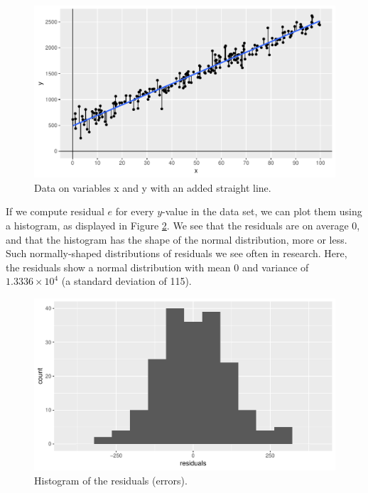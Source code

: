 \documentclass[]{report}\usepackage[]{graphicx}\usepackage[]{color}
\makeatletter
\def\maxwidth{ %
  \ifdim\Gin@nat@width>\linewidth
    \linewidth
  \else
    \Gin@nat@width
  \fi
}
\newenvironment{knitrout}{}{} %
\makeatother
\begin{document}
\begin{knitrout}
\color{fgcolor}\begin{figure}

{\centering \includegraphics[width=\maxwidth]{figure/lm_10-1} 

}

\caption[Data on variables x and y with an added straight line]{Data on variables x and y with an added straight line.}\label{fig:lm_10}
\end{figure}


\end{knitrout}

If we compute residual $e$ for every $y$-value in the data set, we can plot them using a histogram, as displayed in Figure \ref{fig:lm_11}. We see that the residuals are on average 0, and that the histogram has the shape of the normal distribution, more or less. Such normally-shaped distributions of residuals we see often in research. Here, the residuals show a normal distribution with mean 0 and variance of \ensuremath{1.3336\times 10^{4}} (a standard deviation of 115).


\begin{knitrout}
\color{fgcolor}\begin{figure}

{\centering \includegraphics[width=\maxwidth]{figure/lm_11-1} 

}

\caption[Histogram of the residuals (errors)]{Histogram of the residuals (errors).}\label{fig:lm_11}
\end{figure}


\end{knitrout}
\end{document}
